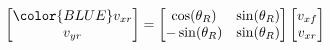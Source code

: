 \documentclass[preview]{standalone}
\begin{document}
\begin{align*}
\begin{bmatrix} {\color{BLUE}v_{xr}} \\ v_{yr} \end{bmatrix} =\begin{bmatrix} \cos(\theta_R) &  \sin(\theta_R)\\ -\sin(\theta_R) & \sin(\theta_R) \end{bmatrix} \begin{bmatrix} v_{xf} \\ v_{xr} \end{bmatrix}
\end{align*}
\end{document}
